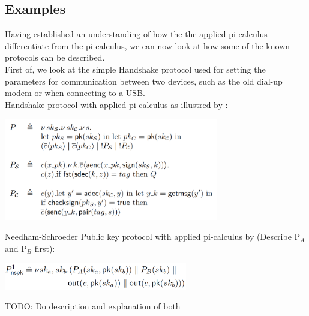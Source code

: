 \subsection{Examples}
Having established an understanding of how the the applied pi-calculus differentiate from the pi-calculus, we can now look at how some of the known protocols can be described.\\
First of, we look at the simple Handshake protocol used for setting the parameters for communication between two devices, such as the old dial-up modem or when connecting to a USB.  \\
Handshake protocol with applied pi-calculus as illustred by \citeauthor{AplliedPiCalsulus2010}:
\begin{center}
\includegraphics[width=0.7\textwidth, angle=0]{Graphics/Handshake.pdf}
\end{center}
Needham-Schroeder Public key protocol with applied pi-calculus by \citeauthor{DBLP:journals/ftpl/CortierK14,} (Describe P$_{A}$ and P$_{B}$ first):
\begin{center}
\includegraphics[width=0.6\textwidth, angle=0]{Graphics/P1_nspk.pdf}
\end{center}
TODO: Do description and explanation of both 
